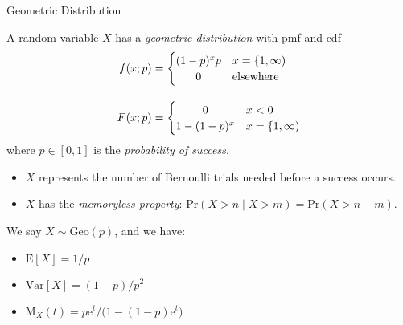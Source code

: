 \documentclass[8pt, handout]{beamer}
\renewcommand{\emph}[1]{\textcolor{defcol}{\textsl{#1}}}
\begin{document}
\begin{frame}{Geometric Distribution}

    A random variable \(X\) has a \emph{geometric distribution} with pmf and cdf
    \begin{align*}
        f(x;p) &= \begin{cases}
            (1 - p)^x p & x = \{ 1, \infty ) \\
            \hfil 0 & \text{elsewhere}
        \end{cases} \\[1em]
        F(x;p) &= \begin{cases}
            \hfil 0 & x < 0 \\
            1 - (1 - p)^x & x = \{ 1, \infty )
        \end{cases}
    \end{align*}
    where \(p \in [0,1]\) is the \emph{probability of success}.
    \begin{itemize}
        \item \(X\) represents the number of Bernoulli trials needed before a success occurs. 
        \item \(X\) has the \emph{memoryless property}: \(\mathrm{Pr}(X > n \;|\; X > m) = \mathrm{Pr}(X > n - m)\).
    \end{itemize}

    \vspace{2em}
    We say \(X \sim \mathrm{Geo}(p)\), and we have:
    \begin{itemize}
        \item \(\mathrm{E}[X] = 1/p\)
        \item \(\mathrm{Var}[X] = (1 - p)/p^2\)
        \item \(\mathrm{M}_X(t) = p \mathrm{e}^t / \big( 1 - (1 - p)\mathrm{e}^t \big)\)
    \end{itemize}

\end{frame}
\end{document}

